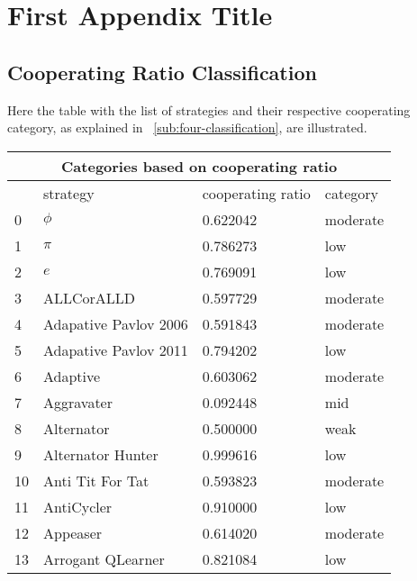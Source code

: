 \chapter{First Appendix Title}

\section{Cooperating Ratio Classification}
\label{append:class-categories}
Here the table with the list of strategies and their respective cooperating
category, as explained in ~\ref{sub:four-classification}, are illustrated.

\begin{longtable}{|p{0.5cm}||p{6cm}||p{4cm}||p{2cm}|}
			\hline
			\multicolumn{4}{|c|}{Categories based on cooperating ratio}           \\ \hline
			    & strategy                    & cooperating ratio & category \\  \hline
			0   & $\phi$                      & 0.622042          & moderate \\ \hline
			1   & $\pi$                       & 0.786273          & low      \\ \hline
			2   & $e$                         & 0.769091          & low      \\ \hline
			3   & ALLCorALLD                  & 0.597729          & moderate \\ \hline
			4   & Adapative Pavlov 2006       & 0.591843          & moderate \\ \hline
			5   & Adapative Pavlov 2011       & 0.794202          & low      \\ \hline
			6   & Adaptive                    & 0.603062          & moderate \\ \hline
			7   & Aggravater                  & 0.092448          & mid      \\ \hline
			8   & Alternator                  & 0.500000          & weak     \\ \hline
			9   & Alternator Hunter           & 0.999616          & low      \\ \hline
			10  & Anti Tit For Tat            & 0.593823          & moderate \\ \hline
			11  & AntiCycler                  & 0.910000          & low      \\ \hline
			12  & Appeaser                    & 0.614020          & moderate \\ \hline
			13  & Arrogant QLearner           & 0.821084          & low      \\ \hline

\end{longtable}
